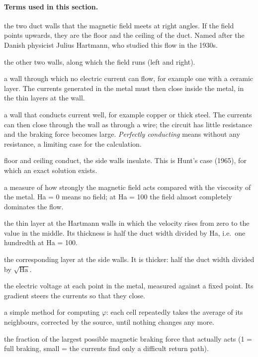 \paragraph{Terms used in this section.}
\begin{description}\itemsep2pt
\item[Hartmann walls] the two duct walls that the magnetic field meets at right angles. If the field points upwards,
  they are the floor and the ceiling of the duct. Named after the Danish physicist Julius Hartmann, who studied this
  flow in the 1930s.
\item[side walls] the other two walls, along which the field runs (left and right).
\item[insulating wall] a wall through which no electric current can flow, for example one with a ceramic layer. The
  currents generated in the metal must then close inside the metal, in the thin layers at the wall.
\item[conducting wall] a wall that conducts current well, for example copper or thick steel. The currents can then
  close through the wall as through a wire; the circuit has little resistance and the braking force becomes large.
  \emph{Perfectly conducting} means without any resistance, a limiting case for the calculation.
\item[conducting Hartmann walls] floor and ceiling conduct, the side walls insulate. This is Hunt's case (1965), for
  which an exact solution exists.
\item[Hartmann number Ha] a measure of how strongly the magnetic field acts compared with the viscosity of the metal.
  Ha = 0 means no field; at Ha = 100 the field almost completely dominates the flow.
\item[Hartmann layer] the thin layer at the Hartmann walls in which the velocity rises from zero to the value in the
  middle. Its thickness is half the duct width divided by Ha, i.e.\ one hundredth at Ha = 100.
\item[side layer] the corresponding layer at the side walls. It is thicker: half the duct width divided by
  $\sqrt{\mathrm{Ha}}$.
\item[potential $\varphi$] the electric voltage at each point in the metal, measured against a fixed point. Its
  gradient steers the currents so that they close.
\item[Jacobi step] a simple method for computing $\varphi$: each cell repeatedly takes the average of its neighbours,
  corrected by the source, until nothing changes any more.
\item[pressure-drop coefficient $k_p$] the fraction of the largest possible magnetic braking force that actually acts
  (1 = full braking, small = the currents find only a difficult return path).
\end{description}

